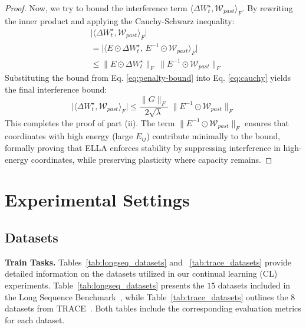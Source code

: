 \begin{proof}
Now, we try to bound the interference term $\langle \Delta W_t^\star,\mathcal{W}_{past}\rangle_F$. By rewriting the inner product and applying the Cauchy-Schwarz inequality:
\begin{align}
&\bigl|\langle \Delta W_t^\star,\mathcal{W}_{past}\rangle_F\bigr| \\
&=
\bigl|\langle E\odot \Delta W_t^\star,\, E^{-1}\odot \mathcal{W}_{past}\rangle_F\bigr|\\
&\le
\|E\odot \Delta W_t^\star\|_F\ \|E^{-1}\odot \mathcal{W}_{past}\|_F
\label{eq:cauchy}
\end{align}
Substituting the bound from Eq. \eqref{eq:penalty-bound} into Eq. \eqref{eq:cauchy} yields the final interference bound:
\[
\bigl|\langle \Delta W_t^\star,\mathcal{W}_{past}\rangle_F\bigr|
\le
\frac{\|G\|_F}{2\sqrt{\lambda}}\;\|E^{-1}\odot \mathcal{W}_{past}\|_F
\]
This completes the proof of part (ii). The term $\|E^{-1}\odot \mathcal{W}_{past}\|_F$ ensures that coordinates with high energy (large $E_{ij}$) contribute minimally to the bound, formally proving that ELLA enforces stability by suppressing interference in high-energy coordinates, while preserving plasticity where capacity remains.

\end{proof}

\section{Experimental Settings}
\label{app_expsettings}
\subsection{Datasets}

\hspace{10pt}\textbf{Train Tasks.} Tables~\ref{tab:longseq_datasets} and ~\ref{tab:trace_datasets} provide detailed information on the datasets utilized in our continual
learning (CL) experiments. Table~\ref{tab:longseq_datasets} presents the $15$
datasets included in the Long Sequence Benchmark~\cite{razdaibiedina2023progressive}, while Table~\ref{tab:trace_datasets} outlines
the $8$ datasets from TRACE~\cite{wang2023trace}. Both tables include the corresponding evaluation
metrics for each dataset.

